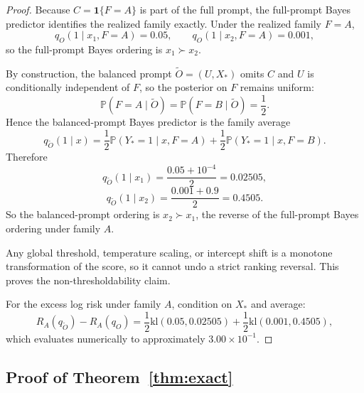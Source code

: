 \documentclass{article}
\theoremstyle{definition}
\theoremstyle{remark}
\newcommand{\Pbb}{\mathbb{P}}
\newcommand{\ind}{\mathbf{1}}
\newcommand{\klb}{\mathrm{kl}}
\begin{document}
\begin{proof}
Because $C=\ind\{F=A\}$ is part of the full prompt, the full-prompt Bayes predictor identifies the realized family exactly. Under the realized family $F=A$,
\[
q_O(1\mid x_1,F=A)=0.05,
\qquad
q_O(1\mid x_2,F=A)=0.001,
\]
so the full-prompt Bayes ordering is $x_1 \succ x_2$.

By construction, the balanced prompt $\widetilde O=(U,X_*)$ omits $C$ and $U$ is conditionally independent of $F$, so the posterior on $F$ remains uniform:
\[
\Pbb(F=A\mid \widetilde O)=\Pbb(F=B\mid \widetilde O)=\frac{1}{2}.
\]
Hence the balanced-prompt Bayes predictor is the family average
\[
q_{\widetilde O}(1\mid x)
=
\frac{1}{2}\Pbb(Y_*=1\mid x,F=A)
+
\frac{1}{2}\Pbb(Y_*=1\mid x,F=B).
\]
Therefore
\[
q_{\widetilde O}(1\mid x_1)
=
\frac{0.05+10^{-4}}{2}
=
0.02505,
\]
\[
q_{\widetilde O}(1\mid x_2)
=
\frac{0.001+0.9}{2}
=
0.4505.
\]
So the balanced-prompt ordering is $x_2 \succ x_1$, the reverse of the full-prompt Bayes ordering under family $A$.

Any global threshold, temperature scaling, or intercept shift is a monotone transformation of the score, so it cannot undo a strict ranking reversal. This proves the non-thresholdability claim.

For the excess log risk under family $A$, condition on $X_*$ and average:
\[
R_A(q_{\widetilde O})-R_A(q_O)
=
\frac{1}{2}\klb(0.05,0.02505)
+
\frac{1}{2}\klb(0.001,0.4505),
\]
which evaluates numerically to approximately $3.00\times 10^{-1}$.
\end{proof}

\subsection{Proof of Theorem~\ref{thm:exact}}
\end{document}
